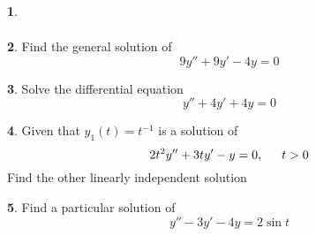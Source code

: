 \documentclass[11pt]{article}
\theoremstyle{definition}
\newtheorem{q}{}
\begin{document}
\begin{multicols*}{2}
\begin{q}
\begin{align*}
			\end{align*}
		\end{q}	
		\begin{q}
			Find the general solution of 
			\[ 9y'' + 9y' - 4y = 0 \]
		\end{q}
		\begin{q}
			Solve the differential equation \[ y'' + 4y' + 4y = 0 \]
		\end{q}
		\begin{q}
			Given that $ y_1(t) = t^{-1} $ is a solution of \[ 2t^2y'' + 3ty' - y = 0, \indent  t>0 \] Find the other linearly independent solution 
		\end{q}
		\begin{q}
		Find a particular solution of \[ y'' - 3y' -4y = 2 \sin t  \]
		\end{q}
		
		
		
	
	\end{multicols*}
\end{document}
